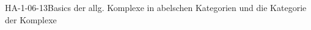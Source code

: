 
\begin{STUD}{HA-1-06-13}{Basics der allg. Komplexe in abelschen Kategorien und die Kategorie der Komplexe}
\end{STUD}
